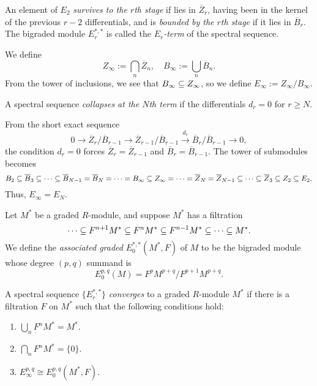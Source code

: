 \documentclass{MetricNotes2023}
\def\subq{\ensuremath\subseteq}
\begin{document}
\begin{definition}
An element of \(E_2\) \textit{survives to the \(r\)th stage} if lies in \(\overline{Z}_r\), having been in the kernel of the previous \(r-2\) differentials, and is \textit{bounded by the \(r\)th stage} if it lies in \(\overline{B}_r\). The bigraded module \(E_r^{*,*}\) is called the \textit{\(E_r\)-term} of the spectral sequence. 
\end{definition}

We define 
\[Z_\infty:= \bigcap_n \overline{Z}_n, \quad B_\infty:=\bigcup_n \overline{B}_n.\]
From the tower of inclusions, we see that \(B_\infty\subq Z_\infty\), so we define \(E_\infty:=Z_\infty/B_\infty\). 

\begin{definition}
A spectral sequence \textit{collapses at the \(N\)th term} if the differentials \(d_r=0\) for \(r\geq N\). 
\end{definition}

From the short exact sequence 
\[0 \to \overline Z_{r}/\overline B_{r-1}\to \overline Z_{r-1}/\overline B_{r-1} \xrightarrow{d_{r}} \overline B_{r}/\overline{B}_{r-1}\to 0,\]
the condition \(d_r=0\) forces  \(\overline{Z}_r=\overline{Z}_{r-1}\) and \(\overline{B}_r=\overline{B}_{r-1}\). The tower of submodules becomes
\[B_2\subq \overline B_3\subq \cdots \subq \overline B_{N-1}=\overline B_N= \cdots=B_\infty \subq Z_\infty= \cdots = \overline Z_N=\overline Z_{N-1}\subq \cdots \subq \overline Z_3\subq Z_2\subq E_2.\]
Thus, \(E_\infty=E_N\). 

Let \(M^*\) be a graded \(R\)-module, and suppose \(M^*\) has a filtration
\[\cdots \subq F^{n+1}M^*\subq F^nM^* \subq F^{n-1}M^*\subq \cdots \subq M^*.\]
We define the \textit{associated graded} \(E^{*,*}_0(M^*, F)\) of \(M\) to be the bigraded module whose degree \((p,q)\) summand is
\[E^{p,q}_0(M)= F^pM^{p+q}/F^{p+1}M^{p+q}.\]

\begin{definition}\label{2504291808}
A spectral sequence \(\{E_r^{*,*}\}\) \textit{converges} to a graded \(R\)-module \(M^*\) if there is a filtration \(F\) on \(M^*\) such that the following conditions hold:
\begin{enumerate}
\item \(\bigcup_n F^nM^* = M^*\).
\item \(\bigcap_n F^nM^*=\{0\}\).
\item \(E_\infty^{p,q}\cong E^{p,q}_0(M^*, F)\).
\end{enumerate}
\end{definition}
\end{document}
